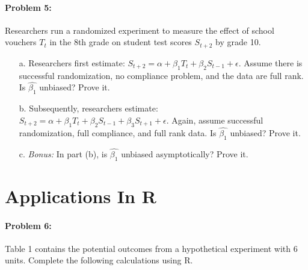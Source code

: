 \documentclass{article}
\begin{document}
\paragraph{Problem 5:} 
Researchers run a randomized experiment to measure the effect of
school vouchers $T_t$ in the 8th grade on student test scores
$S_{t+2}$ by grade 10.
\begin{enumerate}
\item[a.] Researchers first estimate:
  $S_{t+2}=\alpha+\beta_1T_t+\beta_2 S_{t-1}+\epsilon$.  Assume there is successful
  randomization, no compliance problem, and the data are full
  rank. Is $\hat{\beta_1}$ unbiased?  Prove it.
\item[b.] Subsequently, researchers estimate:
  $S_{t+2}=\alpha+\beta_1T_t+\beta_2S_{t-1}+\beta_3S_{t+1}+\epsilon$.
  Again, assume successful randomization, full compliance, and
  full rank data. Is $\hat{\beta_1}$ unbiased?  Prove it.
\item[c.] \textit{Bonus:} In part (b), is $\hat{\beta_1}$ unbiased
  asymptotically?  Prove it.
\end{enumerate}





\section*{Applications In R}

\paragraph{Problem 6:} 

Table 1 contains the potential outcomes from a hypothetical experiment
with 6 units.  Complete the following calculations using R.
\end{document}
